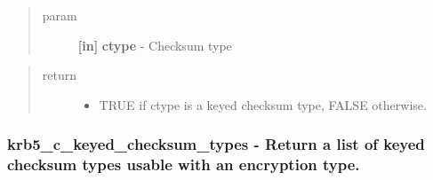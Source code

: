 \documentclass[letterpaper,10pt,english]{sphinxmanual}
\begin{document}
\begin{quote}\begin{description}
\item[{param}] \leavevmode
\textbf{{[}in{]}} \textbf{ctype} - Checksum type

\end{description}\end{quote}
\begin{quote}\begin{description}
\item[{return}] \leavevmode\begin{itemize}
\item {} 
TRUE if ctype is a keyed checksum type, FALSE otherwise.

\end{itemize}

\end{description}\end{quote}


\subsubsection{krb5\_c\_keyed\_checksum\_types -  Return a list of keyed checksum types usable with an encryption type.}
\label{appdev/refs/api/krb5_c_keyed_checksum_types::doc}\label{appdev/refs/api/krb5_c_keyed_checksum_types:krb5-c-keyed-checksum-types-return-a-list-of-keyed-checksum-types-usable-with-an-encryption-type}

\begin{fulllineitems}
\label{appdev/refs/api/krb5_c_keyed_checksum_types:c.krb5_c_keyed_checksum_types}
\end{fulllineitems}
\end{document}
